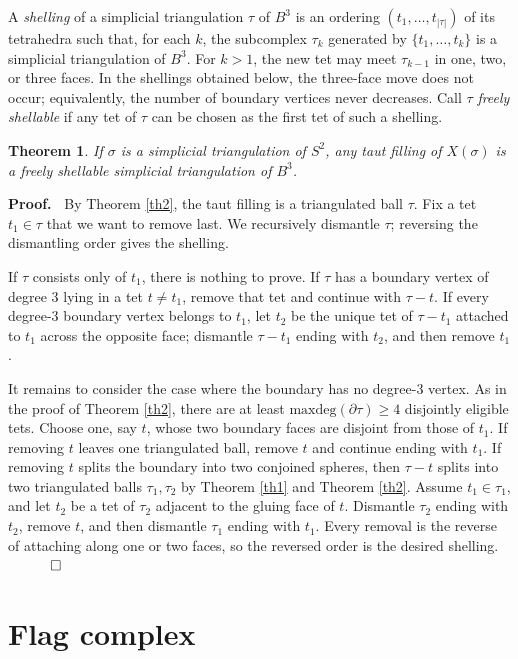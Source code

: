 \documentclass[12pt]{article}
\newtheorem{theorem}{Theorem}
\newcommand{\proofstart}{{\noindent \bf Proof.\ }}
\newcommand{\proofend}{$\quad \qed$}
\newcommand{\kw}{\mathrm}
\newcommand{\maxdeg}{\kw{maxdeg}}
\begin{document}
A \emph{shelling} of a simplicial triangulation $\tau$ of $B^3$
is an ordering
$(t_1,\ldots,t_{|\tau|})$
of its tetrahedra such that, for each $k$,
the subcomplex $\tau_k$ generated by $\{t_1,\ldots,t_k\}$ is a
simplicial triangulation of $B^3$.
For $k>1$, the new tet may meet $\tau_{k-1}$ in one, two, or three
faces.  In the shellings obtained below, the three-face move does not
occur; equivalently, the number of boundary vertices never decreases.
Call $\tau$ \emph{freely shellable} if any tet of $\tau$ can be chosen as
the first tet of such a shelling.

\begin{theorem} \label{th3}
If $\sigma$ is a simplicial triangulation of $S^2$,
any taut filling of $X(\sigma)$ is a freely shellable
simplicial triangulation of $B^3$.
\end{theorem}

\proofstart
By Theorem \ref{th2}, the taut filling is a triangulated ball $\tau$.
Fix a tet $t_1 \in \tau$ that we want to remove last.
We recursively dismantle $\tau$; reversing the dismantling order gives
the shelling.

If $\tau$ consists only of $t_1$, there is nothing to prove.
If $\tau$ has a boundary vertex of degree $3$ lying in a tet
$t\ne t_1$, remove that tet and continue with $\tau-t$.
If every degree-$3$ boundary vertex belongs to $t_1$, let $t_2$ be the
unique tet of $\tau-t_1$ attached to $t_1$ across the opposite face;
dismantle $\tau-t_1$ ending with $t_2$, and then remove $t_1$.

It remains to consider the case where the boundary has no degree-$3$
vertex.  As in the proof of Theorem \ref{th2}, there are at least
$\maxdeg(\partial \tau)\geq 4$ disjointly eligible tets.
Choose one, say $t$, whose two boundary faces are disjoint from those of
$t_1$.
If removing $t$ leaves one triangulated ball, remove $t$ and continue
ending with $t_1$.
If removing $t$ splits the boundary into two conjoined spheres, then
$\tau-t$ splits into two triangulated balls $\tau_1,\tau_2$ by
Theorem \ref{th1} and Theorem \ref{th2}.
Assume $t_1\in \tau_1$, and let $t_2$ be a tet of $\tau_2$ adjacent to
the gluing face of $t$.
Dismantle $\tau_2$ ending with $t_2$, remove $t$, and then dismantle
$\tau_1$ ending with $t_1$.
Every removal is the reverse of attaching along one or two faces, so the
reversed order is the desired shelling.
\proofend

\section{Flag complex}
\end{document}
